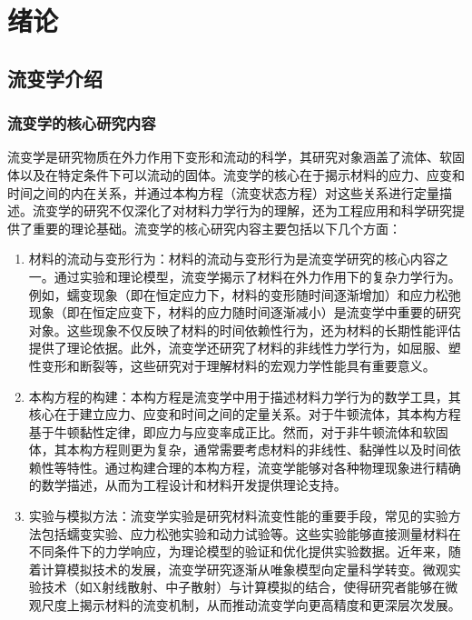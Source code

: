 \chapter{绪论}

\section{流变学介绍}
\subsection{流变学的核心研究内容}
流变学是研究物质在外力作用下变形和流动的科学，其研究对象涵盖了流体、软固体以及在特定条件下可以流动的固体\cite{dealyIntroductionRheology1990}。流变学的核心在于揭示材料的应力、应变和时间之间的内在关系，并通过本构方程（流变状态方程）对这些关系进行定量描述。流变学的研究不仅深化了对材料力学行为的理解，还为工程应用和科学研究提供了重要的理论基础。流变学的核心研究内容主要包括以下几个方面\cite{elleroTanner90Years2024,ewoldtDesigningComplexFluids2022}：
\begin{enumerate}[topsep = 0 pt, itemsep= 0 pt, parsep=0pt, partopsep=0pt, leftmargin=44pt, itemindent=0pt, labelsep=6pt, label=(\arabic*)]
	\item 材料的流动与变形行为：材料的流动与变形行为是流变学研究的核心内容之一。通过实验和理论模型，流变学揭示了材料在外力作用下的复杂力学行为。例如，蠕变现象（即在恒定应力下，材料的变形随时间逐渐增加）和应力松弛现象（即在恒定应变下，材料的应力随时间逐渐减小）是流变学中重要的研究对象\cite{BARNES19971,banerjeeRoleRheologyMorphology2023}。这些现象不仅反映了材料的时间依赖性行为，还为材料的长期性能评估提供了理论依据。此外，流变学还研究了材料的非线性力学行为，如屈服、塑性变形和断裂等，这些研究对于理解材料的宏观力学性能具有重要意义\cite{zenerElasticityAnelasticityMetals1949,hajikarimiViscoelasticityTheoreticalBackground2023}。
	\item	  本构方程的构建：本构方程是流变学中用于描述材料力学行为的数学工具，其核心在于建立应力、应变和时间之间的定量关系。对于牛顿流体，其本构方程基于牛顿黏性定律，即应力与应变率成正比\cite{elleroTanner90Years2024}。然而，对于非牛顿流体和软固体，其本构方程则更为复杂，通常需要考虑材料的非线性、黏弹性以及时间依赖性等特性\cite{sunReviewConstitutiveModels2024}。通过构建合理的本构方程，流变学能够对各种物理现象进行精确的数学描述，从而为工程设计和材料开发提供理论支持。
	\item  实验与模拟方法：流变学实验是研究材料流变性能的重要手段，常见的实验方法包括蠕变实验、应力松弛实验和动力试验等\cite{ewoldtDesigningComplexFluids2022}。这些实验能够直接测量材料在不同条件下的力学响应，为理论模型的验证和优化提供实验数据。近年来，随着计算模拟技术的发展，流变学研究逐渐从唯象模型向定量科学转变。微观实验技术（如X射线散射、中子散射）与计算模拟的结合，使得研究者能够在微观尺度上揭示材料的流变机制，从而推动流变学向更高精度和更深层次发展\cite{kuschelNonlinearEnhancementUltrafast2025,sun2022relaxation}。
\end{enumerate}
